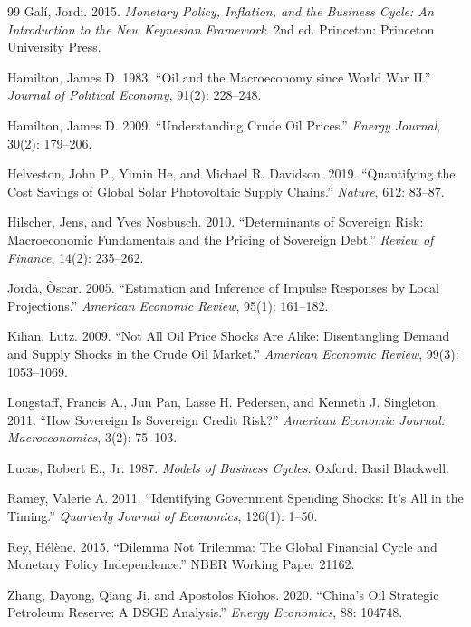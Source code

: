 \documentclass[12pt]{article}
\begin{document}
\begin{thebibliography}{99}
Gal\'{i}, Jordi. 2015. \textit{Monetary Policy, Inflation, and the Business Cycle: An Introduction to the New Keynesian Framework}. 2nd ed. Princeton: Princeton University Press.

Hamilton, James D. 1983. ``Oil and the Macroeconomy since World War II.'' \textit{Journal of Political Economy}, 91(2): 228--248.

Hamilton, James D. 2009. ``Understanding Crude Oil Prices.'' \textit{Energy Journal}, 30(2): 179--206.

Helveston, John P., Yimin He, and Michael R. Davidson. 2019. ``Quantifying the Cost Savings of Global Solar Photovoltaic Supply Chains.'' \textit{Nature}, 612: 83--87.

Hilscher, Jens, and Yves Nosbusch. 2010. ``Determinants of Sovereign Risk: Macroeconomic Fundamentals and the Pricing of Sovereign Debt.'' \textit{Review of Finance}, 14(2): 235--262.

Jord\`{a}, \`{O}scar. 2005. ``Estimation and Inference of Impulse Responses by Local Projections.'' \textit{American Economic Review}, 95(1): 161--182.

Kilian, Lutz. 2009. ``Not All Oil Price Shocks Are Alike: Disentangling Demand and Supply Shocks in the Crude Oil Market.'' \textit{American Economic Review}, 99(3): 1053--1069.

Longstaff, Francis A., Jun Pan, Lasse H. Pedersen, and Kenneth J. Singleton. 2011. ``How Sovereign Is Sovereign Credit Risk?'' \textit{American Economic Journal: Macroeconomics}, 3(2): 75--103.

Lucas, Robert E., Jr. 1987. \textit{Models of Business Cycles}. Oxford: Basil Blackwell.

Ramey, Valerie A. 2011. ``Identifying Government Spending Shocks: It's All in the Timing.'' \textit{Quarterly Journal of Economics}, 126(1): 1--50.

Rey, H\'{e}l\`{e}ne. 2015. ``Dilemma Not Trilemma: The Global Financial Cycle and Monetary Policy Independence.'' NBER Working Paper 21162.

Zhang, Dayong, Qiang Ji, and Apostolos Kiohos. 2020. ``China's Oil Strategic Petroleum Reserve: A DSGE Analysis.'' \textit{Energy Economics}, 88: 104748.

\end{thebibliography}
\end{document}
